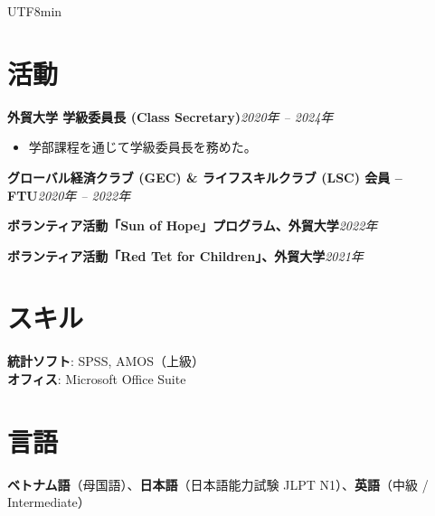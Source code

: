 \documentclass[10.5pt]{article}
\begin{document}
\begin{CJK}{UTF8}{min}

\section{活動}

\textbf{外貿大学 学級委員長 (Class Secretary)}\hfill \emph{2020年 -- 2024年}
\vspace{-0.5em}
\begin{itemize}
    \item 学部課程を通じて学級委員長を務めた。
\end{itemize}
\vspace{-0.3em}
\textbf{グローバル経済クラブ (GEC) \& ライフスキルクラブ (LSC) 会員 -- FTU}\hfill \emph{2020年 -- 2022年}

\textbf{ボランティア活動「Sun of Hope」プログラム、外貿大学}\hfill \emph{2022年}

\textbf{ボランティア活動「Red Tet for Children」、外貿大学}\hfill \emph{2021年}


\section{スキル}

\textbf{統計ソフト}: SPSS, AMOS（上級）\\
\textbf{オフィス}: Microsoft Office Suite


\section{言語}

\textbf{ベトナム語}（母国語）、\textbf{日本語}（日本語能力試験 JLPT N1）、\textbf{英語}（中級 / Intermediate）

\end{CJK}
\end{document}
